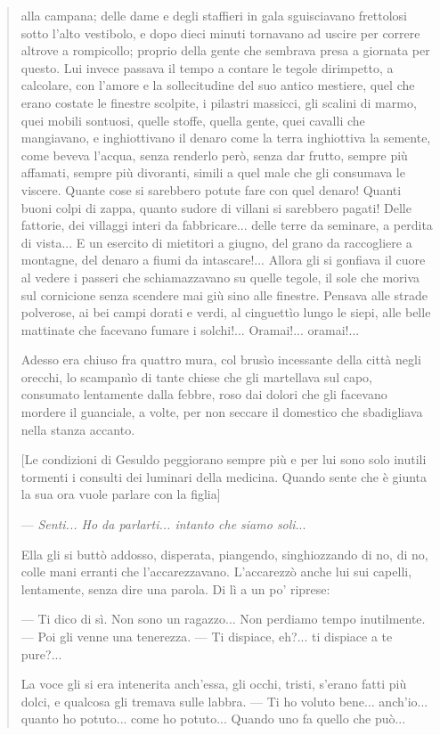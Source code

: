 \documentclass{book}
\newcounter{mar}
\begin{document}
\begin{quote}
alla campana; delle dame e degli staffieri in gala sguisciavano frettolosi sotto l’alto vestibolo, e dopo dieci minuti tornavano ad uscire per correre altrove a rompicollo; proprio della gente che sembrava presa a giornata per questo. Lui invece passava il tempo a contare le tegole dirimpetto, a calcolare, con l’amore e la sollecitudine del suo antico mestiere, quel che erano costate le finestre scolpite, i pilastri massicci, gli scalini di marmo, quei mobili sontuosi, quelle stoffe, quella gente, quei cavalli che mangiavano, e inghiottivano il denaro come la terra inghiottiva la semente, come beveva l’acqua, senza renderlo però, senza dar frutto, sempre più affamati, sempre più divoranti, simili a quel male che gli consumava le viscere. Quante cose si sarebbero potute fare con quel denaro! Quanti buoni colpi di zappa, quanto sudore di villani si sarebbero pagati! Delle fattorie, dei villaggi interi da fabbricare... delle terre da seminare, a perdita di vista... E un esercito di mietitori a giugno, del grano da raccogliere a montagne, del denaro a fiumi da intascare!... Allora gli si gonfiava il cuore al vedere i passeri che schiamazzavano su quelle tegole, il sole che moriva sul cornicione senza scendere mai giù sino alle finestre. Pensava alle strade polverose, ai bei campi dorati e verdi, al cinguettìo lungo le siepi, alle belle mattinate che facevano fumare i solchi!... Oramai!... oramai!...

Adesso era chiuso fra quattro mura, col brusìo incessante della città negli orecchi, lo scampanìo di tante chiese che gli martellava sul capo, consumato lentamente dalla febbre, roso dai dolori che gli facevano mordere il guanciale, a volte, per non seccare il domestico che sbadigliava nella stanza accanto. 

[Le condizioni di Gesuldo peggiorano sempre più e per lui sono solo inutili tormenti i consulti dei luminari della medicina. Quando sente che è giunta la sua ora vuole parlare con la figlia]

— \textit{Senti... Ho da parlarti... intanto che siamo soli}...

Ella gli si buttò addosso, disperata, piangendo, singhiozzando di no, di no, colle mani erranti che l’accarezzavano. L’accarezzò anche lui sui capelli, lentamente, senza dire una parola. Di lì a un po’ riprese:

— Ti dico di sì. Non sono un ragazzo... Non perdiamo tempo inutilmente. — Poi gli venne una tenerezza. — Ti dispiace, eh?... ti dispiace a te pure?...

La voce gli si era intenerita anch’essa, gli occhi, tristi, s’erano fatti più dolci, e qualcosa gli tremava sulle labbra. — Ti ho voluto bene... anch’io... quanto ho potuto... come ho potuto... Quando uno fa quello che può...


\end{quote}
\end{document}

